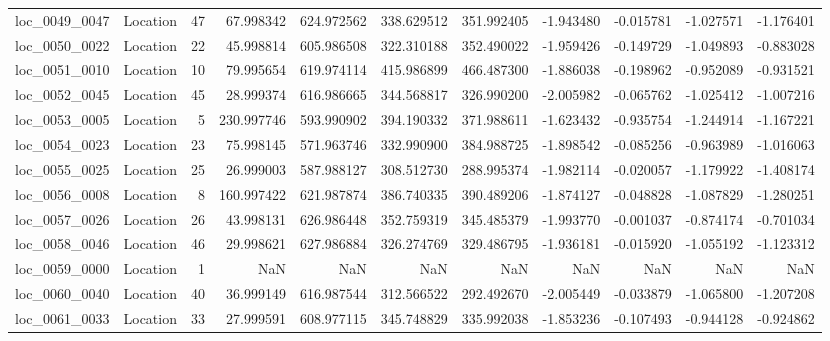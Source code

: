 \begin{tabular}{llrrrrrrrrr}
loc_0049_0047 &        Location &              47 &  67.998342 & 624.972562 &  338.629512 &    351.992405 &  -1.943480 &  -0.015781 &   -1.027571 &     -1.176401 \\
loc_0050_0022 &        Location &              22 &  45.998814 & 605.986508 &  322.310188 &    352.490022 &  -1.959426 &  -0.149729 &   -1.049893 &     -0.883028 \\
loc_0051_0010 &        Location &              10 &  79.995654 & 619.974114 &  415.986899 &    466.487300 &  -1.886038 &  -0.198962 &   -0.952089 &     -0.931521 \\
loc_0052_0045 &        Location &              45 &  28.999374 & 616.986665 &  344.568817 &    326.990200 &  -2.005982 &  -0.065762 &   -1.025412 &     -1.007216 \\
loc_0053_0005 &        Location &               5 & 230.997746 & 593.990902 &  394.190332 &    371.988611 &  -1.623432 &  -0.935754 &   -1.244914 &     -1.167221 \\
loc_0054_0023 &        Location &              23 &  75.998145 & 571.963746 &  332.990900 &    384.988725 &  -1.898542 &  -0.085256 &   -0.963989 &     -1.016063 \\
loc_0055_0025 &        Location &              25 &  26.999003 & 587.988127 &  308.512730 &    288.995374 &  -1.982114 &  -0.020057 &   -1.179922 &     -1.408174 \\
loc_0056_0008 &        Location &               8 & 160.997422 & 621.987874 &  386.740335 &    390.489206 &  -1.874127 &  -0.048828 &   -1.087829 &     -1.280251 \\
loc_0057_0026 &        Location &              26 &  43.998131 & 626.986448 &  352.759319 &    345.485379 &  -1.993770 &  -0.001037 &   -0.874174 &     -0.701034 \\
loc_0058_0046 &        Location &              46 &  29.998621 & 627.986884 &  326.274769 &    329.486795 &  -1.936181 &  -0.015920 &   -1.055192 &     -1.123312 \\
loc_0059_0000 &        Location &               1 &        NaN &        NaN &         NaN &           NaN &        NaN &        NaN &         NaN &           NaN \\
loc_0060_0040 &        Location &              40 &  36.999149 & 616.987544 &  312.566522 &    292.492670 &  -2.005449 &  -0.033879 &   -1.065800 &     -1.207208 \\
loc_0061_0033 &        Location &              33 &  27.999591 & 608.977115 &  345.748829 &    335.992038 &  -1.853236 &  -0.107493 &   -0.944128 &     -0.924862 \\

\end{tabular}
